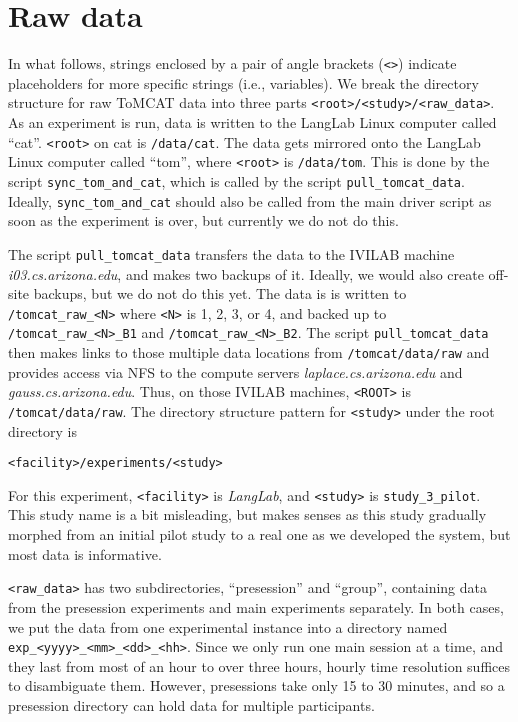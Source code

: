 \nocite{*}
\section{Raw data}

In what follows, strings enclosed by a pair of angle brackets (\verb|<>|) indicate
placeholders for more specific strings (i.e., variables).
We break the directory structure for raw ToMCAT data into three parts
\verb|<root>/<study>/<raw_data>|.
As an experiment is run, data is written to the LangLab Linux computer called
``cat''. \verb|<root>| on cat is
\verb|/data/cat|. The data gets mirrored onto the LangLab Linux computer called
``tom'', where \verb|<root>| is \verb|/data/tom|.
This is done by the script \verb|sync_tom_and_cat|, which is called by the script
\verb|pull_tomcat_data|. Ideally, \verb|sync_tom_and_cat| should also be
called from the main driver script as soon as the experiment is over, but
currently we do not do this.

The script \verb|pull_tomcat_data| transfers the data to the IVILAB machine
\textit{i03.cs.arizona.edu}, and makes two backups of it.  Ideally, we would
also create off-site backups, but we do not do this yet. The data is is
written to
\verb|/tomcat_raw_<N>| where \verb|<N>| is 1, 2, 3, or 4, and backed up to
\verb|/tomcat_raw_<N>_B1| and \verb|/tomcat_raw_<N>_B2|.
The script \verb|pull_tomcat_data| then makes links to those multiple data
locations from \verb|/tomcat/data/raw| and provides access via NFS to the compute
servers \textit{laplace.cs.arizona.edu} and \textit{gauss.cs.arizona.edu}.
Thus, on those IVILAB machines, \verb|<ROOT>| is \verb|/tomcat/data/raw|.
The directory structure pattern for \verb|<study>| under the root directory is

\begin{verbatim}
<facility>/experiments/<study>
\end{verbatim}

For this experiment, \verb|<facility>| is \textit{LangLab}, and \verb|<study>|
is \verb|study_3_pilot|.  This study name is a bit misleading, but makes senses
as this study gradually morphed from an initial pilot study to a real one as we
developed the system, but most data is informative.

\verb|<raw_data>| has two subdirectories, ``presession'' and ``group'', containing data
from the presession experiments and main experiments separately. In both cases, we put the
data from one experimental instance into a directory named
\verb|exp_<yyyy>_<mm>_<dd>_<hh>|. Since we only run one main session at a time, and
they last from most of an hour to over three hours, hourly time resolution
suffices to disambiguate them. However, presessions take only 15 to 30 minutes,
and so a presession directory can hold data for multiple participants.


